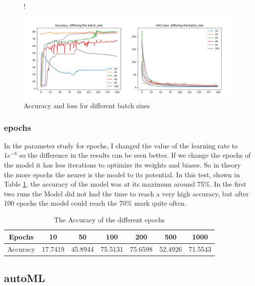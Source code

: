 \documentclass[a4paper, 12pt, oneside]{scrbook}
\begin{document}
					\begin{figure} [H]
						\centering
						\resizebox{\linewidth} {!} {
							\includegraphics{res/parameter_study/batch_ps.png}
							
						}
						\caption{Accuracy and loss for different batch sizes}
						\label{fig:parameter_study_batch}
					\end{figure}
					
					
				\subsubsection{epochs}
					In the parameter study for epochs, I changed the value of the learning rate to $1e^{-8}$ so the difference in the results can be seen better. If we change the epochs of the model it has less iterations to optimize its weights and biases. So in theory the more epochs the nearer is the model to its potential. In this test, shown in Table \ref{tab:parameter_study}, the accuracy of the model was at its maximum around 75\%. In the first two runs the Model did not had the time to reach a very high accuracy, but after 100 epochs the model could reach the 70\% mark quite often. 
				\begin{table}[!h]
					\begin{center}
						\begin{tabular}{| c || c | c | c | c  | c | c | }
							\hline
							Epochs & 10 & 50  & 100 & 200 & 500 & 1000 \\
							\hline
							Accuracy & 17.7419  & 45.8944 & 75.5131 & 75.6598 & 52.4926 & 71.5543 \\ 
							\hline
						\end{tabular}
						\caption{\label{tab:parameter_study}The Accuracy of the different epochs}
					\end{center}
				\end{table}	
		
		\subsection{autoML}
			
\end{document}

